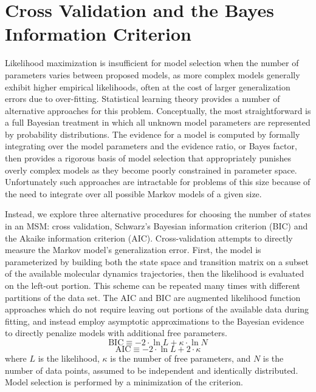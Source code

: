 \documentclass[journal=jpcbfk, layout=traditional, manuscript=article]{achemso}
\begin{document}
\section{Cross Validation and the Bayes Information Criterion}
Likelihood maximization is insufficient for model selection when the number of parameters varies between proposed models, as more complex models generally exhibit higher empirical likelihoods, often at the cost of larger generalization errors due to over-fitting\cite{Liddle2007Information, Hastie01Elements}. Statistical learning theory provides a number of alternative approaches for this problem. Conceptually, the most straightforward is a full Bayesian treatment in which all unknown model parameters are represented by probability distributions. The evidence for a model is computed by formally integrating over the model parameters and the evidence ratio, or Bayes factor\cite{Gelfand94Bayesian}, then provides a rigorous basis of model selection that appropriately punishes overly complex models as they become poorly constrained in parameter space. Unfortunately such approaches are intractable for problems of this size because of the need to integrate over all possible Markov models of a given size.

Instead, we explore three alternative procedures for choosing the number of states in an MSM: cross validation, Schwarz's Bayesian information criterion (BIC)\cite{Schwartz78Estimating} and the Akaike information criterion (AIC)\cite{Akaike1974AIC}. Cross-validation attempts to directly measure the Markov model's generalization error. First, the model is parameterized by building both the state space and transition matrix on a subset of the available molecular dynamics trajectories, then the likelihood is evaluated on the left-out portion. This scheme can be repeated many times with different partitions of the data set. The AIC and BIC are augmented likelihood function approaches which do not require leaving out portions of the available data during fitting, and instead employ asymptotic approximations to the Bayesian evidence to directly penalize models with additional free parameters.
\begin{equation}
\label{eq:bic}
\mathrm{BIC} \equiv -2\cdot \ln L + \kappa \cdot \ln N
\end{equation}
\begin{equation}
\label{eq:aic}
\mathrm{AIC} \equiv -2\cdot \ln L + 2 \cdot \kappa
\end{equation} where $L$ is the likelihood, $\kappa$ is the number of free parameters, and $N$ is the number of data points, assumed to be independent and identically distributed. Model selection is performed by a minimization of the criterion.
\end{document}
